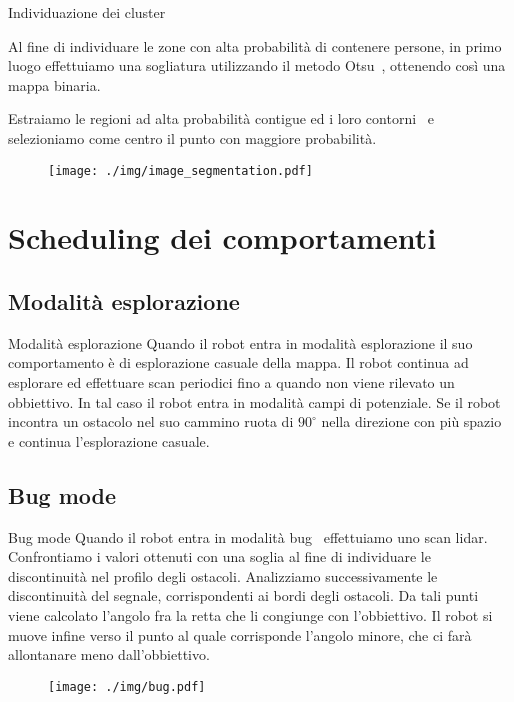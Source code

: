 \documentclass[aspectratio=169, leqno]{beamer}
\begin{document}
	\begin{frame}{Individuazione dei cluster}
	
	Al fine di individuare le zone con alta probabilità di contenere persone, 
	in primo luogo effettuiamo una sogliatura utilizzando il metodo Otsu~\cite{otsu}, 
	ottenendo così una mappa binaria.
		
	Estraiamo le regioni ad alta probabilità contigue
	ed i loro contorni~\cite{contours} e selezioniamo come centro il punto
	con maggiore probabilità.

	\begin{figure}[H]
		\centering
		\texttt{[image: ./img/image\_segmentation.pdf]}
	\end{figure}

	\end{frame}
	
	\section{Scheduling dei comportamenti}\label{sec:Scheduling-dei-comportamenti}
	\frame{\sectionpage}
	\subsection{Modalità esplorazione}\label{subsec:Modalita-esplorazione}
	\begin{frame}{Modalità esplorazione}
	Quando il robot entra in modalità esplorazione il suo comportamento è di
	esplorazione casuale della mappa. Il robot continua ad esplorare ed
	effettuare scan periodici fino a quando non viene rilevato un obbiettivo.
	In tal caso il robot entra in modalità campi di potenziale. Se il robot
	incontra un ostacolo nel suo cammino ruota di $90^{\circ}$ nella direzione
	con più spazio e continua l'esplorazione casuale.
	\end{frame}
	
	\subsection{Bug mode}\label{subsec:Bug-mode}
	\begin{frame}{Bug mode}
	Quando il robot entra in modalità bug~\cite{503814} effettuiamo uno scan lidar. 
	Confrontiamo i valori ottenuti con una
	soglia al fine di individuare le discontinuità nel profilo degli ostacoli. 
	Analizziamo successivamente le discontinuità del segnale,
	corrispondenti ai bordi degli ostacoli.
	Da tali punti viene calcolato l'angolo fra la retta che li
	congiunge con l'obbiettivo. Il robot si muove infine verso il punto al
	quale corrisponde l'angolo minore, che ci farà allontanare meno
	dall'obbiettivo.
	
	\begin{figure}[H]
		\centering
		\texttt{[image: ./img/bug.pdf]}
		\label{fig:bug}
	\end{figure}

	\end{frame}
\end{document}
